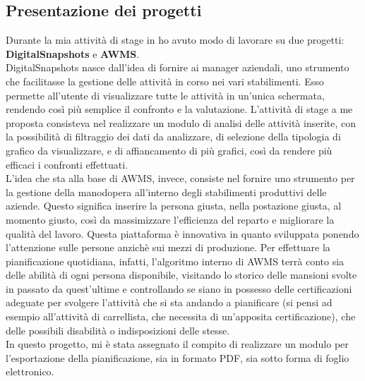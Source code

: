 \subsection{Presentazione dei progetti}
Durante la mia attività di stage in \AD{} ho avuto modo di lavorare su due progetti: \textbf{DigitalSnapshots} e \textbf{AWMS}.\\
DigitalSnapshots nasce dall'idea di fornire ai manager aziendali, uno strumento che facilitasse la gestione delle attività in corso nei vari stabilimenti. Esso permette all'utente di visualizzare tutte le attività in un'unica schermata, rendendo così più semplice il confronto e la valutazione. 
L'attività di stage a me proposta consisteva nel realizzare un modulo di analisi delle attività inserite, con la possibilità di filtraggio dei dati da analizzare, di selezione della tipologia di grafico da visualizzare, e di affiancamento di più grafici, così da rendere più efficaci i confronti effettuati. \\

L'idea che sta alla base di AWMS, invece, consiste nel fornire uno strumento per la gestione della manodopera all'interno degli stabilimenti produttivi delle aziende.
Questo significa inserire la persona giusta, nella postazione giusta, al momento giusto, così da massimizzare l'efficienza del reparto e migliorare la qualità del lavoro.
Questa piattaforma è innovativa in quanto sviluppata ponendo l'attenzione sulle persone anzichè sui mezzi di produzione. Per effettuare la pianificazione quotidiana, infatti, l'algoritmo interno di AWMS terrà conto sia delle abilità di ogni persona disponibile, visitando lo storico delle mansioni svolte in passato da quest'ultime e controllando se siano in possesso delle certificazioni adeguate per svolgere l'attività che si sta andando a pianificare (si pensi ad esempio all'attività di carrellista, che necessita di un'apposita certificazione), che delle possibili disabilità o indisposizioni delle stesse.\\
In questo progetto, mi è stata assegnato il compito di realizzare un modulo per l'esportazione della pianificazione, sia in formato PDF, sia sotto forma di foglio elettronico.

